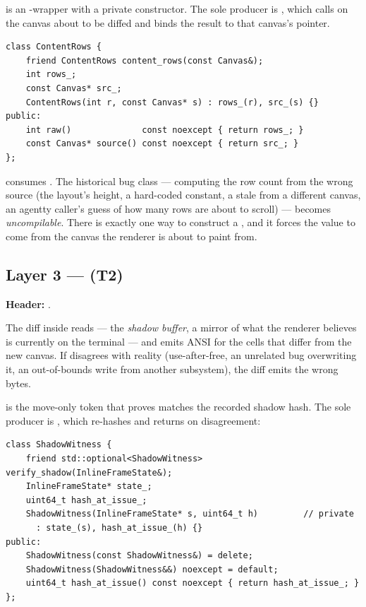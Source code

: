  is an -wrapper with a private
constructor. The sole producer is ,
which calls  on the canvas about to be
diffed and binds the result to that canvas's pointer.

\begin{lstlisting}
class ContentRows {
    friend ContentRows content_rows(const Canvas&);
    int rows_;
    const Canvas* src_;
    ContentRows(int r, const Canvas* s) : rows_(r), src_(s) {}
public:
    int raw()              const noexcept { return rows_; }
    const Canvas* source() const noexcept { return src_; }
};
\end{lstlisting}

 consumes . The
historical bug class --- computing the row count from the wrong
source (the layout's height, a hard-coded constant, a stale
 from a different canvas, an agentty caller's
guess of how many rows are about to scroll) --- becomes
\emph{uncompilable}. There is exactly one way to construct a
, and it forces the value to come from the canvas
the renderer is about to paint from.

\subsection{Layer 3 ---  (T2)}

\textbf{Header:} .

The diff inside  reads
 --- the \emph{shadow buffer}, a mirror of
what the renderer believes is currently on the terminal --- and
emits ANSI for the cells that differ from the new canvas. If
 disagrees with reality (use-after-free, an
unrelated bug overwriting it, an out-of-bounds write from another
subsystem), the diff emits the wrong bytes.

 is the move-only token that proves
 matches the recorded shadow hash. The sole
producer is , which re-hashes
 and returns  on disagreement:

\begin{lstlisting}
class ShadowWitness {
    friend std::optional<ShadowWitness> verify_shadow(InlineFrameState&);
    InlineFrameState* state_;
    uint64_t hash_at_issue_;
    ShadowWitness(InlineFrameState* s, uint64_t h)         // private
      : state_(s), hash_at_issue_(h) {}
public:
    ShadowWitness(const ShadowWitness&) = delete;
    ShadowWitness(ShadowWitness&&) noexcept = default;
    uint64_t hash_at_issue() const noexcept { return hash_at_issue_; }
};
\end{lstlisting}

